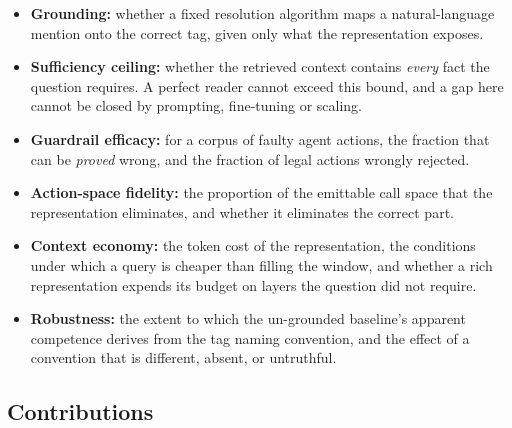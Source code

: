 \begin{itemize}
  \item \textbf{Grounding:} whether a fixed resolution algorithm maps a
  natural-language mention onto the correct tag, given only what the
  representation exposes.
  \item \textbf{Sufficiency ceiling:} whether the retrieved context contains
  \emph{every} fact the question requires. A perfect reader cannot exceed this
  bound, and a gap here cannot be closed by prompting, fine-tuning or scaling.
  \item \textbf{Guardrail efficacy:} for a corpus of faulty agent actions, the
  fraction that can be \emph{proved} wrong, and the fraction of legal actions
  wrongly rejected.
  \item \textbf{Action-space fidelity:} the proportion of the emittable call
  space that the representation eliminates, and whether it eliminates the correct
  part.
  \item \textbf{Context economy:} the token cost of the representation, the
  conditions under which a query is cheaper than filling the window, and whether a
  rich representation expends its budget on layers the question did not require.
  \item \textbf{Robustness:} the extent to which the un-grounded baseline's
  apparent competence derives from the tag naming convention, and the effect of a
  convention that is different, absent, or untruthful.
\end{itemize}

\subsection{Contributions}

